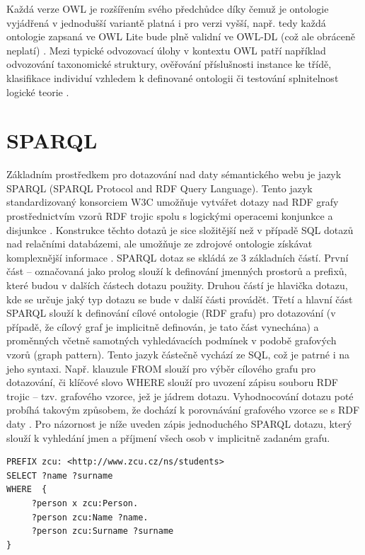\documentclass{projekt}
\begin{document}
Každá verze OWL je rozšířením svého předchůdce díky čemuž je ontologie vyjádřená v jednodušší variantě platná i pro verzi vyšší, např. tedy každá ontologie zapsaná ve OWL Lite bude plně validní ve OWL-DL (což ale obráceně neplatí) \cite{_11}.
Mezi typické odvozovací úlohy v kontextu OWL patří například odvozování taxonomické struktury, ověřování příslušnosti instance ke třídě, klasifikace individuí vzhledem k definované ontologii či testování splnitelnost logické teorie \cite{_12}.


\section{SPARQL}
\hspace{0.65cm}Základním prostředkem pro dotazování nad daty sémantického webu je jazyk SPARQL (SPARQL Protocol and RDF Query Language). Tento jazyk standardizovaný konsorciem W3C umožňuje vytvářet dotazy nad RDF grafy prostřednictvím vzorů RDF trojic spolu s logickými operacemi konjunkce a disjunkce \cite{_2}. Konstrukce těchto dotazů je sice složitější než v případě SQL dotazů nad relačními databázemi, ale umožňuje ze zdrojové ontologie získávat komplexnější informace \cite{_3}. SPARQL dotaz se skládá ze 3 základních částí. První část – označovaná jako prolog slouží k definování jmenných prostorů a prefixů, které budou v dalších částech dotazu použity. Druhou částí je hlavička dotazu, kde se určuje jaký typ dotazu se bude v další části provádět. Třetí a hlavní část SPARQL slouží k definování cílové ontologie (RDF grafu) pro dotazování (v případě, že cílový graf je implicitně definován, je tato část vynechána) a proměnných včetně samotných vyhledávacích podmínek v podobě grafových vzorů (graph pattern)\cite{_2}.
Tento jazyk částečně vychází ze SQL, což je patrné i na jeho syntaxi. Např. klauzule FROM slouží pro výběr cílového grafu pro dotazování, či klíčové slovo WHERE slouží pro uvození zápisu souboru RDF trojic – tzv. grafového vzorce, jež je jádrem dotazu. Vyhodnocování dotazu poté probíhá takovým způsobem, že dochází k porovnávání grafového vzorce se s RDF daty \cite{_13}. 
Pro názornost je níže uveden zápis jednoduchého SPARQL dotazu, který slouží k vyhledání jmen a příjmení všech osob v implicitně zadaném grafu.

\begin{verbatim}
PREFIX zcu: <http://www.zcu.cz/ns/students>
SELECT ?name ?surname
WHERE  {
     ?person x zcu:Person.
     ?person zcu:Name ?name.
     ?person zcu:Surname ?surname
}
\end{verbatim}
\end{document}
